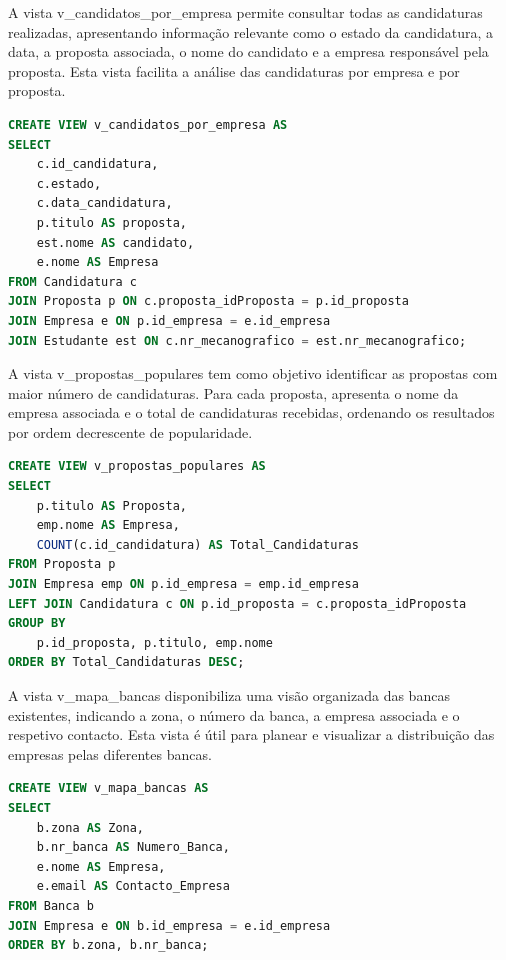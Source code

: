 \documentclass[12pt,a4paper]{article}
\begin{document}
A vista v\_candidatos\_por\_empresa permite consultar todas as candidaturas
realizadas, apresentando informação relevante como o estado da candidatura, a
data, a proposta associada, o nome do candidato e a empresa responsável pela
proposta. Esta vista facilita a análise das candidaturas por empresa e por
proposta.

\begin{lstlisting}[language=SQL,caption={Vista que demonstra as empresas e os candidatos com a sua proposta}, label={lst:roles}]
CREATE VIEW v_candidatos_por_empresa AS
SELECT
    c.id_candidatura,
    c.estado,
    c.data_candidatura,
    p.titulo AS proposta,
    est.nome AS candidato,
    e.nome AS Empresa
FROM Candidatura c
JOIN Proposta p ON c.proposta_idProposta = p.id_proposta
JOIN Empresa e ON p.id_empresa = e.id_empresa
JOIN Estudante est ON c.nr_mecanografico = est.nr_mecanografico;
\end{lstlisting}

A vista v\_propostas\_populares tem como objetivo identificar as propostas com
maior número de candidaturas. Para cada proposta, apresenta o nome da empresa
associada e o total de candidaturas recebidas, ordenando os resultados por ordem
decrescente de popularidade.

\begin{lstlisting}[language=SQL,caption={Views que demonstra as propostas "populares"}, label={lst:roles}]
CREATE VIEW v_propostas_populares AS
SELECT 
    p.titulo AS Proposta, 
    emp.nome AS Empresa, 
    COUNT(c.id_candidatura) AS Total_Candidaturas
FROM Proposta p
JOIN Empresa emp ON p.id_empresa = emp.id_empresa
LEFT JOIN Candidatura c ON p.id_proposta = c.proposta_idProposta
GROUP BY 
    p.id_proposta, p.titulo, emp.nome
ORDER BY Total_Candidaturas DESC;
\end{lstlisting}

\newpage

A vista v\_mapa\_bancas disponibiliza uma visão organizada das bancas
existentes, indicando a zona, o número da banca, a empresa associada e o
respetivo contacto. Esta vista é útil para planear e visualizar a distribuição
das empresas pelas diferentes bancas.

\begin{lstlisting}[language=SQL,caption={Views que demonstra as bancas}, label={lst:roles}]
CREATE VIEW v_mapa_bancas AS
SELECT 
    b.zona AS Zona, 
    b.nr_banca AS Numero_Banca, 
    e.nome AS Empresa, 
    e.email AS Contacto_Empresa
FROM Banca b
JOIN Empresa e ON b.id_empresa = e.id_empresa
ORDER BY b.zona, b.nr_banca;
\end{lstlisting}
\end{document}
